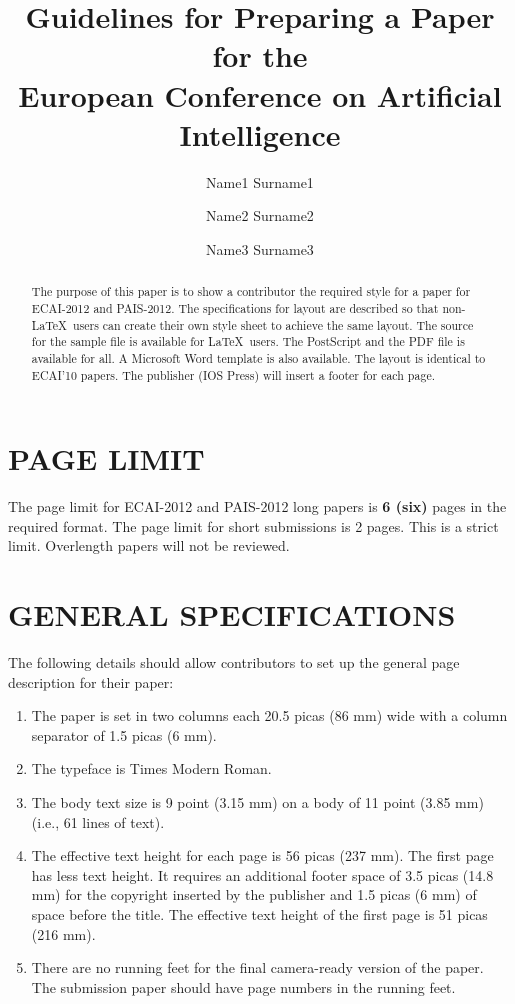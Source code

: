 \documentclass{ecai2012}
\begin{document}
\title{Guidelines for Preparing a Paper for the \\
European Conference on Artificial Intelligence}

\author{Name1 Surname1 \and Name2 Surname2 \and Name3 Surname3 }

\maketitle


\begin{abstract}
  The purpose of this paper is to show a contributor the required
  style for a paper for ECAI-2012 and PAIS-2012. The specifications
  for layout are described so that non-\LaTeX\ users can create their
  own style sheet to achieve the same layout. The source for the
  sample file is available for \LaTeX\ users. The PostScript and the
  PDF file is available for all. A Microsoft Word template is also available.
 The layout is identical to ECAI'10
  papers. The publisher (IOS Press) will insert a footer for each
  page.
\end{abstract}

\section{PAGE LIMIT}
The page limit for ECAI-2012 and PAIS-2012 long papers is \textbf{6
  (six)} pages in the required format. The page limit for short
submissions is 2 pages. This is a strict limit. Overlength papers will
not be reviewed.

\section{GENERAL SPECIFICATIONS}
The following details should allow contributors to set up the general
page description for their paper:

\begin{enumerate}
\item The paper is set in two columns each 20.5 picas (86 mm) wide
  with a column separator of 1.5 picas (6 mm).

\item The typeface is Times Modern Roman.

\item The body text size is 9 point (3.15 mm) on a body of 11
point (3.85 mm) (i.e., 61 lines of text).

\item The effective text height for each page is 56 picas (237 mm).
The first page has less text height. It requires an additional footer
space of 3.5 picas (14.8 mm) for the copyright inserted by the publisher
and 1.5 picas (6 mm) of space before the title.
The effective text height of the first page is 51 picas (216 mm).

\item There are no running feet for the final camera-ready version of the
paper. The submission paper should have page numbers in the running feet.

\end {enumerate}
\end{document}
